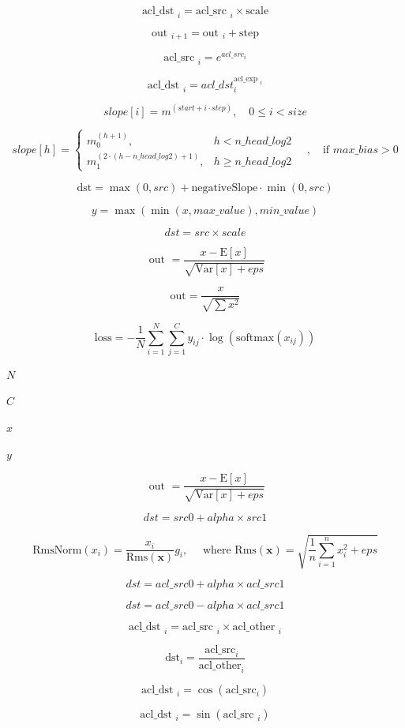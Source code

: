\documentclass{article}
\begin{document}
\[    \text {acl_dst }_i=\text {acl_src }_i \times \text {scale}
\]
\pagebreak

\[   \text {out }_{i+1}=\text {out }_i+\text {step}
\]
\pagebreak

\[    \text {acl_src }_i=e^{acl\_src_i}
\]
\pagebreak

\[    \text {acl_dst }_i=acl\_dst_i^{\text {acl_exp }_i}
\]
\pagebreak

\[slope[i] = m^{\left( start + i \cdot step \right)}, \quad 0 \le i < size
\]
\pagebreak

\[slope[h] =
\begin{cases}
m_0^{(h + 1)}, & h < n\_head\_log2 \\
m_1^{\left( 2 \cdot (h - n\_head\_log2) + 1 \right)}, & h \geq n\_head\_log2
\end{cases}
\quad , \quad \text{if } max\_bias > 0
\]
\pagebreak

\[             \text{dst} = \max(0, src) + \text{negativeSlope} \cdot \min(0,
              src)
\]
\pagebreak

\[             y = \max(\min(x, max\_value), min\_value)
\]
\pagebreak

\[            dst = src \times scale
\]
\pagebreak

\[             \text { out }=\frac{x-\mathrm{E}[x]}{\sqrt{\text{Var}[x]+eps}}
\]
\pagebreak

\[             \text{out} = \frac{x}{\sqrt{\sum{x^2}}}
\]
\pagebreak

\[             \text{loss} = -\frac{1}{N} \sum_{i=1}^{N} \sum_{j=1}^{C} y_{ij} \cdot \log(\text{softmax}(x_{ij}))
\]
\pagebreak

$N$
\pagebreak

$C$
\pagebreak

$x$
\pagebreak

$y$
\pagebreak

\[            \text { out }=\frac{x-\mathrm{E}[x]}{\sqrt{\text{Var}[x]+eps}}
\]
\pagebreak

\[              dst = src0 + alpha \times src1
\]
\pagebreak

\[              \text{RmsNorm}\left(x_i\right)=\frac{x_i}{\text{Rms}(\mathbf{x})} g_i,
              \quad \text { where } \text{Rms}(\mathbf{x})=\sqrt{\frac{1}{n} \sum_{i=1}^n x_i^2+e p s}
\]
\pagebreak

\[   dst = acl\_src0 + alpha \times acl\_src1
\]
\pagebreak

\[   dst = acl\_src0 - alpha \times acl\_src1
\]
\pagebreak

\[    \text {acl_dst }_i=\text {acl_src }_i \times \text {acl_other }_i
\]
\pagebreak

\[    \text{dst}_i = \frac{\text{acl_src}_i}{\text{acl_other}_i}
\]
\pagebreak

\[ \text {acl_dst }_i=\cos \left(\text {acl_src
}_i\right) \]
\pagebreak

\[      \text {acl_dst }_i=\sin \left(\text {acl_src }_i\right)
\]
\pagebreak
\end{document}
